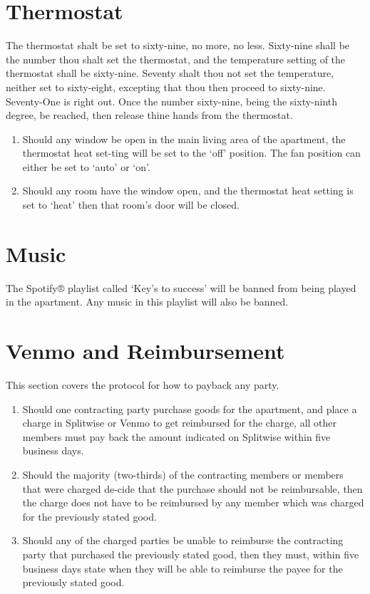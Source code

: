 \documentclass[10pt]{article}
\begin{document}
\section{Thermostat}
The thermostat shalt be set to sixty-nine, no more, no less. Sixty-nine shall be the number thou shalt set the thermostat, and the temperature setting of the thermostat shall be sixty-nine. Seventy shalt thou not set the temperature, neither set to sixty-eight, excepting that thou then proceed to sixty-nine. Seventy-One is right out. Once the number sixty-nine, being the sixty-ninth degree, be reached, then release thine hands from the thermostat.
\begin{enumerate}
	\item Should any window be open in the main living area of the apartment, the thermostat heat set-ting will be set to the ‘off’ position. The fan position can either be set to ‘auto’ or ‘on’.
	\item Should any room have the window open, and the thermostat heat setting is set to ‘heat’ then that room’s door will be closed.
	
\end{enumerate}

\section{Music}
The Spotify® playlist called ‘Key’s to success’ will be banned from being played in the apartment. Any music in this playlist will also be banned.
\section{Venmo and Reimbursement}
This section covers the protocol for how to payback any party.
\begin{enumerate}
	\item Should one contracting party purchase goods for the apartment, and place a charge in Splitwise or Venmo to get reimbursed for the charge, all other members must pay back the amount indicated on Splitwise within five business days.
	\item Should the majority (two-thirds) of the contracting members or members that were charged de-cide that the purchase should not be reimbursable, then the charge does not have to be reimbursed by any member which was charged for the previously stated good.
	\item Should any of the charged parties be unable to reimburse the contracting party that purchased the previously stated good, then they must, within five business days state when they will be able to reimburse the payee for the previously stated good.
	
\end{enumerate}
\end{document}
